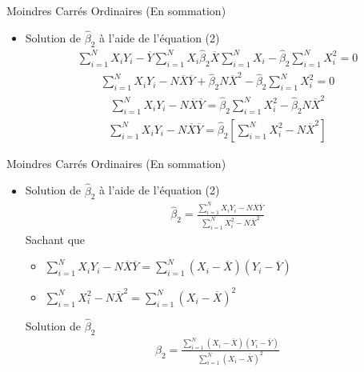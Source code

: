 \documentclass{beamer}
\begin{document}
\begin{frame}{Moindres Carrés Ordinaires (En sommation)}
\begin{itemize}
\item Solution de $\hat{\beta}_2$ à l'aide de l'équation (2)
\begin{align*}
\sum_{i=1}^N X_i Y_i-\overline{Y}\sum_{i=1}^N X_i \hat{\beta}_2 \overline{X} \sum_{i=1}^N X_i -\hat{\beta}_2 \sum_{i=1}^N X_i^2=0
\end{align*}
\begin{align*}
\sum_{i=1}^N X_i Y_i-N \overline{X} \overline{Y}+\hat{\beta}_2 N \overline{X}^2-\hat{\beta}_2 \sum_{i=1}^N X_i^2=0
\end{align*}
\begin{align*}
\sum_{i=1}^N X_i Y_i-N \overline{X} \overline{Y}=\hat{\beta}_2 \sum_{i=1}^N X_i^2-\hat{\beta}_2 N \overline{X}^2
\end{align*}
\begin{align*}
\sum_{i=1}^N X_i Y_i-N \overline{X} \overline{Y}= \hat{\beta}_2 \left[ \sum_{i=1}^N X_i^2- N \overline{X}^2 \right]
\end{align*}
\end{itemize}
\end{frame}

\begin{frame}{Moindres Carrés Ordinaires (En sommation)}
\begin{itemize}
\item Solution de $\hat{\beta}_2$ à l'aide de l'équation (2)
\begin{align*}
\hat{\beta}_2=\frac{\sum_{i=1}^N X_i Y_i-N \overline{X} \overline{Y}}{\sum_{i=1}^N X_i^2- N \overline{X}^2}
\end{align*}
Sachant que 
\begin{itemize}
\item $\sum_{i=1}^N X_i Y_i-N \overline{X} \overline{Y}=\sum_{i=1}^N(X_i-\overline{X})(Y_i-\overline{Y})$
\item $\sum_{i=1}^N X_i^2 - N \overline{X}^2 =\sum_{i=1}^N(X_i-\overline{X})^2$
\end{itemize}
\begin{block}{Solution de $\hat{\beta}_2$}
\begin{align*}
\hat{\beta}_2=\frac{\sum_{i=1}^N(X_i-\overline{X})(Y_i-\overline{Y})}{\sum_{i=1}^N(X_i-\overline{X})^2}
\end{align*}
\end{block}
\end{itemize}
\end{frame}
\end{document}

